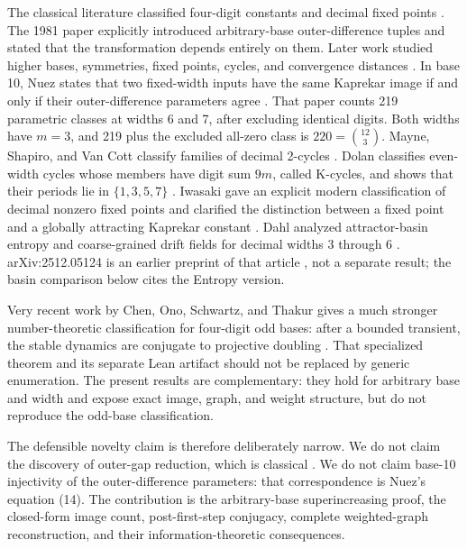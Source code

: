 \documentclass[11pt]{article}
\theoremstyle{definition}
\theoremstyle{remark}
\newcommand{\1}{\mathbf{1}}
\begin{document}
The classical literature classified four-digit constants and decimal fixed
points \cite{hasse1978,prichett1981}.  The 1981 paper explicitly introduced
arbitrary-base outer-difference tuples and stated that the transformation
depends entirely on them.  Later work studied higher bases, symmetries, fixed
points, cycles, and convergence distances
\cite{walden2005,devlin2020,nuez2022,kay2022,kay2024}.  In base 10, Nuez
states that two fixed-width inputs have the same Kaprekar image if and only if
their outer-difference parameters agree \cite[eq.~(14)]{nuez2022}.  That paper
counts 219 parametric classes at widths 6 and 7, after excluding identical
digits.  Both widths have $m=3$, and 219 plus the excluded all-zero class is
$220=\binom{12}{3}$.  Mayne, Shapiro, and Van Cott classify families of
decimal 2-cycles \cite{mayne2026}.  Dolan classifies even-width cycles whose
members have digit sum $9m$, called K-cycles, and shows that their periods
lie in $\{1,3,5,7\}$ \cite{dolan2026kcycles}.  Iwasaki gave an
explicit modern classification of decimal nonzero fixed points and clarified
the distinction between a fixed point and a globally attracting Kaprekar
constant \cite{iwasaki2024}.  Dahl analyzed attractor-basin entropy and
coarse-grained drift fields for decimal widths 3 through 6 \cite{dahl2026}.
arXiv:2512.05124 is an earlier preprint of that article
\cite{dahl2025preprint}, not a separate result; the basin comparison below
cites the Entropy version.

Very recent work by Chen, Ono, Schwartz, and Thakur gives a much stronger
number-theoretic classification for four-digit odd bases: after a bounded
transient, the stable dynamics are conjugate to projective doubling
\cite{chenkaprekar2026}.  That specialized theorem and its separate Lean
artifact should not be replaced by generic enumeration.  The present results
are complementary: they hold for arbitrary base and width and expose exact
image, graph, and weight structure, but do not reproduce the odd-base
classification.

The defensible novelty claim is therefore deliberately narrow.  We do not
claim the discovery of outer-gap reduction, which is classical
\cite{prichett1981}.  We do not claim base-10 injectivity of the
outer-difference parameters: that correspondence is Nuez's equation (14).
The contribution is the arbitrary-base superincreasing proof, the closed-form
image count, post-first-step conjugacy, complete weighted-graph
reconstruction, and their information-theoretic consequences.
\end{document}
